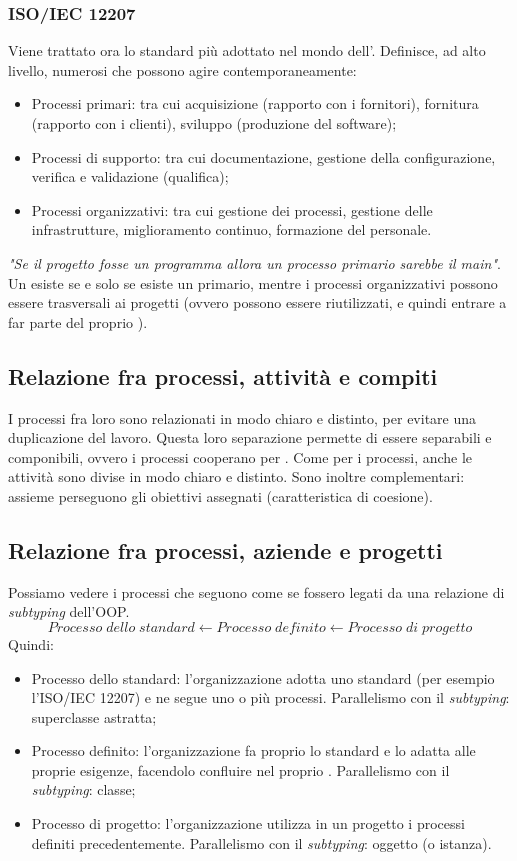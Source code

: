 \documentclass[../main]{subfiles}
\begin{document}
\subsubsection{ISO/IEC 12207}
Viene trattato ora lo standard più adottato nel mondo dell'. Definisce, ad alto livello, numerosi  che possono agire contemporaneamente:
\begin{itemize}
    \item Processi primari: tra cui acquisizione (rapporto con i fornitori), fornitura (rapporto con i clienti), sviluppo (produzione del software);
    \item Processi di supporto: tra cui documentazione, gestione della configurazione, verifica e validazione (qualifica);
    \item Processi organizzativi: tra cui gestione dei processi, gestione delle infrastrutture, miglioramento continuo, formazione del personale.
\end{itemize}
\textit{"Se il progetto fosse un programma allora un processo primario sarebbe il main"}. Un  esiste se e solo se esiste un  primario, mentre i processi organizzativi possono essere trasversali ai progetti (ovvero possono essere riutilizzati, e quindi entrare a far parte del proprio ).
\subsection{Relazione fra processi, attività e compiti}
I processi fra loro sono relazionati in modo chiaro e distinto, per evitare una duplicazione del lavoro. Questa loro separazione permette di essere separabili e componibili, ovvero i processi cooperano per .
Come per i processi, anche le attività sono divise in modo chiaro e distinto. Sono inoltre complementari: assieme perseguono gli obiettivi assegnati (caratteristica di coesione).
\subsection{Relazione fra processi, aziende e progetti}
Possiamo vedere i processi che seguono come se fossero legati da una relazione di \textit{subtyping} dell'OOP.
$$Processo\;dello\;standard \leftarrow Processo\;definito \leftarrow Processo\;di\;progetto$$
Quindi:
\begin{itemize}
    \item Processo dello standard: l'organizzazione adotta uno standard (per esempio l'ISO/IEC 12207) e ne segue uno o più processi. Parallelismo con il \textit{subtyping}: superclasse astratta;
    \item Processo definito: l'organizzazione fa proprio lo standard e lo adatta alle proprie esigenze, facendolo confluire nel proprio . Parallelismo con il \textit{subtyping}: classe;
    \item Processo di progetto: l'organizzazione utilizza in un progetto i processi definiti precedentemente. Parallelismo con il \textit{subtyping}: oggetto (o istanza).
\end{itemize}
\end{document}

